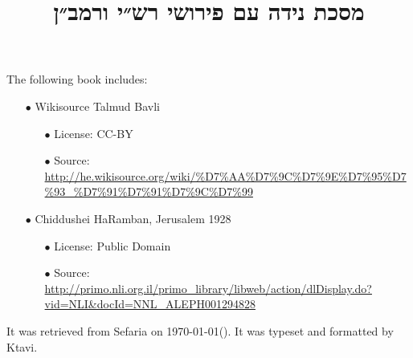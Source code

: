 \documentclass[12pt, openany]{book}
\newcommand{\texttitle}{מסכת נידה עם פירושי רש״י ורמב״ן}\usepackage{titlesec}
\begin{document}
\frontmatter
{}

\title{\texttitle}

\author{}

\date{}

\maketitle

\begin{minipage}[b][\textheight][b]{\textwidth}\englishfont	
	\begin{english}
		\vfill
		The following book includes:
\begin{itemize}
\item[$\bullet$] Wikisource Talmud Bavli
\begin{itemize}
\item[$\bullet$] License: CC-BY
\item[$\bullet$] Source: \url{http://he.wikisource.org/wiki/%D7%AA%D7%9C%D7%9E%D7%95%D7%93_%D7%91%D7%91%D7%9C%D7%99}
\end{itemize}
\item[$\bullet$] Chiddushei HaRamban, Jerusalem 1928
\begin{itemize}
\item[$\bullet$] License: Public Domain
\item[$\bullet$] Source: \url{http://primo.nli.org.il/primo_library/libweb/action/dlDisplay.do?vid=NLI&docId=NNL_ALEPH001294828}
\end{itemize}
\end{itemize}
		It was retrieved from Sefaria on \today\space \texthebrew{(\Hebrewtoday)}.  It was typeset and formatted by Ktavi.
		\clearpage
		
	\end{english}
\end{minipage}

\titlelabel{\thetitle\quad}
\tableofcontents
\end{document}
